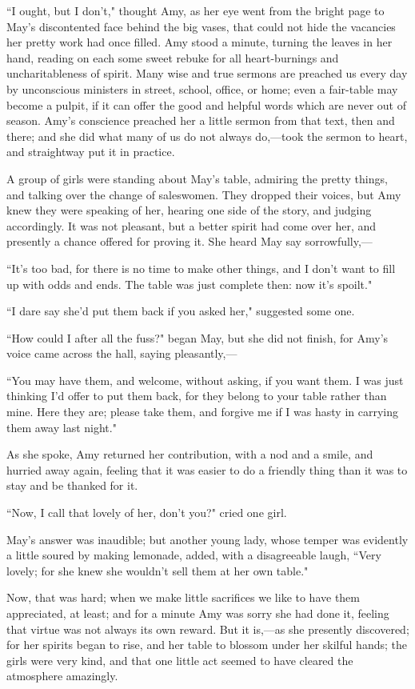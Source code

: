 ``I ought, but I don't," thought Amy, as her eye went
from the bright page to May's discontented face behind
the big vases, that could not hide the vacancies her pretty work had
once filled. Amy stood a minute, turning the leaves in her hand, reading
on each some sweet rebuke for all heart-burnings and uncharitableness of
spirit. Many wise and true sermons are preached us every day by
unconscious ministers in street, school, office, or home; even a
fair-table may become a pulpit, if it can offer the good and helpful
words which are never out of season. Amy's conscience
preached her a little sermon from that text, then and there; and she did
what many of us do not always do,---took the sermon to heart, and
straightway put it in practice.

A group of girls were standing about May's table,
admiring the pretty things, and talking over the change of saleswomen.
They dropped their voices, but Amy knew they were speaking of her,
hearing one side of the story, and judging accordingly. It was not
pleasant, but a better spirit had come over her, and presently a chance
offered for proving it. She heard May say sorrowfully,---

``It's too bad, for there is no time to make other
things, and I don't want to fill up with odds and ends.
The table was just complete then: now it's spoilt."

``I dare say she'd put them back if you asked her,"
suggested some one.

``How could I after all the fuss?" began May, but she did not finish, for
Amy's voice came across the hall, saying pleasantly,---

``You may have them, and welcome, without asking, if you want them. I was
just thinking I'd offer to put them back, for they
belong to your table rather than mine. Here they are; please take them,
and forgive me if I was hasty in carrying them away last night."

As she spoke, Amy returned her contribution, with a nod and a smile, and
hurried away again, feeling that it was easier to do a friendly thing
than it was to stay and be thanked for it.

``Now, I call that lovely of her, don't you?" cried one
girl.

May's answer was inaudible; but another young lady,
whose temper was evidently a little soured by making lemonade, added,
with a disagreeable laugh, ``Very lovely; for she knew she
wouldn't sell them at her own table."

Now, that was hard; when we make little sacrifices we like to have them
appreciated, at least; and for a minute Amy was sorry she had done it,
feeling that virtue was not always its own reward. But it is,---as she
presently discovered; for her spirits began to rise, and her table to
blossom under her skilful hands; the girls were very kind, and that one
little act seemed to have cleared the atmosphere amazingly.

